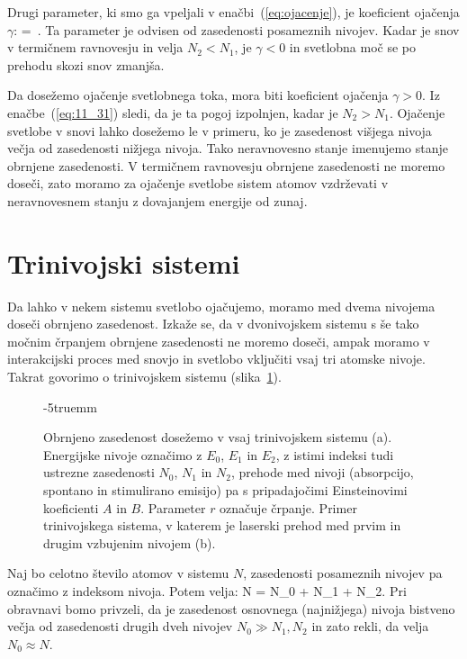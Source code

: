 Drugi parameter, ki smo ga vpeljali v enačbi~(\ref{eq:ojacenje}), 
je koeficient ojačenja $\gamma$:
\beq
\gamma = \sigma \,.
\label{eq:11_31}
\eeq
Ta parameter je odvisen od zasedenosti posameznih  nivojev. 
Kadar je snov v termičnem ravnovesju in velja $N_2 < N_1$, je $\gamma <0$
in svetlobna moč se po prehodu skozi snov zmanjša. 

Da dosežemo
ojačenje svetlobnega toka, mora biti koeficient ojačenja $\gamma >0$. 
Iz enačbe~(\ref{eq:11_31}) sledi, da je ta pogoj izpolnjen, kadar je $N_2>N_1$.
Ojačenje svetlobe v snovi lahko dosežemo le v primeru, ko je zasedenost
višjega nivoja večja od zasedenosti nižjega nivoja. Tako neravnovesno 
stanje imenujemo stanje obrnjene zasedenosti. V termičnem ravnovesju 
obrnjene zasedenosti ne moremo doseči, zato moramo za ojačenje svetlobe
sistem atomov vzdrževati v neravnovesnem stanju z dovajanjem energije od zunaj.

\section{Trinivojski sistemi}
Da lahko v nekem sistemu svetlobo ojačujemo, moramo med 
dvema nivojema doseči obrnjeno zasedenost. Izkaže se, da v dvonivojskem 
sistemu s še tako močnim črpanjem obrnjene zasedenosti ne moremo doseči, 
ampak moramo v interakcijski proces med snovjo in svetlobo vključiti 
vsaj tri atomske nivoje. Takrat govorimo o trinivojskem sistemu 
(slika~\ref{fig:11_3nivojski}).
\begin{figure}[h!]
\centering
\def\svgwidth{100truemm} 

\caption{Obrnjeno zasedenost dosežemo v vsaj trinivojskem sistemu (a). Energijske
nivoje označimo z $E_0$, $E_1$ in $E_2$, z istimi indeksi tudi ustrezne 
zasedenosti $N_0$, $N_1$ in $N_2$, 
prehode med nivoji (absorpcijo, spontano in stimulirano emisijo) pa s pripadajočimi
Einsteinovimi koeficienti $A$ in $B$. Parameter $r$ označuje črpanje. Primer
trinivojskega sistema, v katerem je laserski prehod med prvim in drugim vzbujenim
nivojem (b).
}
\vglue-5truemm
\label{fig:11_3nivojski}
\end{figure}

Naj bo celotno število atomov v sistemu $N$, zasedenosti posameznih nivojev pa 
označimo z indeksom nivoja. Potem velja:
\beq
N = N_0 + N_1 + N_2.
\label{eq:11_32}
\eeq
Pri obravnavi bomo privzeli, da je zasedenost osnovnega (najnižjega) 
nivoja bistveno večja od zasedenosti drugih dveh nivojev $N_0 \gg N_1, N_2$ 
in zato rekli, da velja $N_0 \approx N$. 

